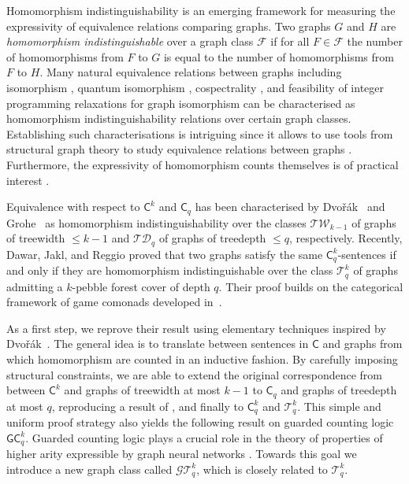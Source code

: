 \documentclass[10pt,a4paper]{article}
\newcommand{\Ekq}{\ensuremath{\mathcal{T}_{q}^{k}}}
\newcommand{\GEkqLL}{\ensuremath{\mathcal{G}\Ekq}}
\begin{document}
Homomorphism indistinguishability is an emerging framework for measuring the expressivity of equivalence relations comparing graphs. Two graphs $G$ and $H$ are \emph{homomorphism indistinguishable} over a graph class $\mathcal{F}$ if for all $F \in \mathcal{F}$ the number of homomorphisms from $F$ to $G$ is equal to the number of homomorphisms from $F$ to $H$. Many natural equivalence relations between graphs including isomorphism \cite{lovasz_operations_1967}, quantum isomorphism \cite{mancinska_quantum_2020}, cospectrality \cite{dell_lovasz_2018}, and feasibility of integer programming relaxations for graph isomorphism \cite{grohe_homomorphism_2022,roberson_lasserre_2023} can be characterised as homomorphism indistinguishability relations over certain graph classes. Establishing such characterisations is intriguing since it allows to use tools from structural graph theory to study equivalence relations between graphs \cite{roberson_oddomorphisms_2022,seppelt_logical_2023}.
Furthermore, the expressivity of homomorphism counts themselves is of practical interest \cite{nguyen_graph_2020,grohe_word2vec_2020}.

Equivalence with respect to $\mathsf{C}^{k}$ and $\mathsf{C}_q$ has been characterised by Dvo\v{r}ák~\cite{dvorak_recognizing_2010} and Grohe~\cite{grohe_counting_2020} as homomorphism indistinguishability over the classes $\mathcal{TW}_{k-1}$ of graphs of treewidth $\leq k-1$ and $\mathcal{TD}_q$ of graphs of treedepth $\leq q$, respectively.
Recently, Dawar, Jakl, and Reggio \cite{dawar_lovasz-type_2021} proved that two graphs satisfy the same $\mathsf{C}^k_q$-sentences if and only if they are homomorphism indistinguishable over the class $\Ekq$ of graphs admitting a $k$-pebble forest cover of depth $q$. Their proof builds on the categorical framework of game comonads developed in~\cite{abramsky_pebbling_2017}.


As a first step, we reprove their result using elementary techniques inspired by Dvo\v{r}\'ak~\cite{dvorak_recognizing_2010}. The general idea is to translate between sentences in $\mathsf{C}$ and graphs from which homomorphism are counted in an inductive fashion. By carefully imposing structural constraints, we are able to extend the original correspondence from \cite{dvorak_recognizing_2010} between $\mathsf{C}^{k}$ and graphs of treewidth at most $k-1$ to $\mathsf{C}_q$ and graphs of treedepth at most $q$, reproducing a result of \cite{grohe_counting_2020}, and finally to $\mathsf{C}^k_q$ and $\Ekq$. This simple and uniform proof strategy also yields the following result on guarded counting logic $\mathsf{GC}^k_q$.
Guarded counting logic plays a crucial role in the theory of properties of higher arity expressible by graph neural networks \cite{grohe_logic_2021}.
Towards this goal we introduce a new graph class called \GEkqLL, which is closely related to \Ekq.
\end{document}

